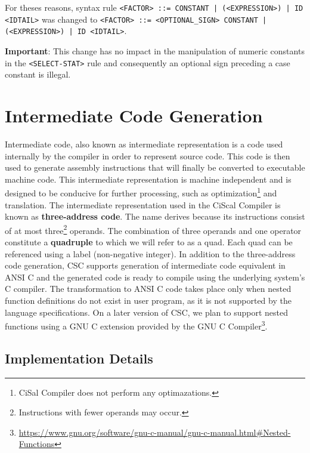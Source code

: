 \documentclass{article}
\def\code#1{\texttt{#1}} %
\begin{document}
For theses reasons, syntax rule \code{<FACTOR> ::= CONSTANT | (<EXPRESSION>) | ID <IDTAIL>} was
changed to \code{<FACTOR> ::= <OPTIONAL\_SIGN> CONSTANT | (<EXPRESSION>) | ID <IDTAIL>}.

\textbf{Important}: This change has no impact in the manipulation of numeric constants in the \code{<SELECT-STAT>}
rule and consequently an optional sign preceding a case constant is illegal.


\section{Intermediate Code Generation}
Intermediate code, also known as intermediate representation is a code used internally by the compiler
in order to represent source code. This code is then used to generate assembly instructions that will finally
be converted to executable machine code. This intermediate representation is machine independent
and is designed to be conducive for further processing, such as optimization\footnote{CiSal Compiler
does not perform any optimazations.} and translation. The intermediate representation used in the CiScal
Compiler is known as \textbf{three-address code}. The name derives because its instructions consist of
at most three\footnote{Instructions with fewer operands may occur.} operands. The combination of three
operands and one operator constitute a \textbf{quadruple} to which we will refer to as a quad. Each quad
can be referenced using a label (non-negative integer). In addition to the three-address code generation,
CSC supports generation of intermediate code equivalent in ANSI C and the generated code is ready to compile
using the underlying system's C compiler. The transformation to ANSI C code takes place only when nested
function definitions do not exist in user program, as it is not supported by the language specifications.
On a later version of CSC, we plan to support nested functions using a GNU C extension provided by the GNU
C Compiler\footnote{\url{https://www.gnu.org/software/gnu-c-manual/gnu-c-manual.html\#Nested-Functions}}.


\subsection{Implementation Details}
\end{document}
